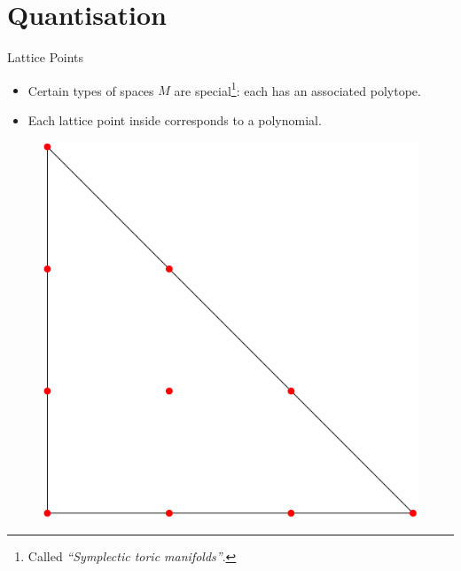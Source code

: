\section{Quantisation}

\begin{frame}{Lattice Points}

    \begin{itemize}
       \item Certain types of spaces $M$ are special\footnote{Called \emph{``Symplectic toric manifolds''}.}: each has an associated polytope.
       \item Each lattice point inside corresponds to a polynomial.
    \end{itemize}

    \begin{figure}
        \includegraphics[scale=0.25]{resources/polynomials.png}
    \end{figure}

\end{frame}

